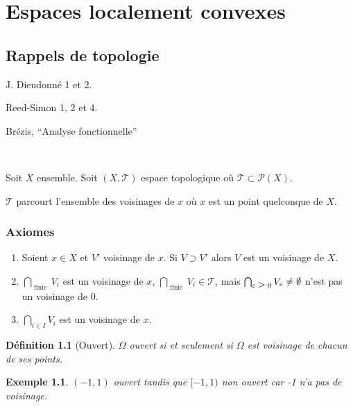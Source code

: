 \documentclass[french]{book}
\title{\bsc{Analyse fonctionnelle et distributions}}
\date{2023-2024}
\newtheorem{definition}{Définition}[section]
\newtheorem{exemple}{Exemple}
\newcommand{\biggg}{\rotatebox[origin=c]{90}{$\lor$}}
\newcommand{\bg}{\ \biggg\ }
\begin{document}
\maketitle

\tableofcontents

\chapter{Espaces localement convexes}

\section{Rappels de topologie}

J. Dieudonné 1 et 2.

Reed-Simon 1, 2 et 4.

Brézis, ``Analyse fonctionnelle''

\

Soit $X$ ensemble. Soit $(X, \mathscr{T} )$ espace topologique où $\mathscr{T}  \subset \mathscr{P}(X) $.

$\mathscr{T} $ parcourt l'ensemble des voisinages de $x$ où $x$ est un point quelconque de $X$.

\subsection{Axiomes}

\begin{enumerate}
  \item Soient $x \in X$ et $ V'$ voisinage de $x$. Si $V \supset V'$ alors $V$ est un voisinage de $X$.
  \item $\bigcap_{\text{ finie } }  V_i$ est un voisinage de $x$, $\bigcap_{\text{ finie } } V_i \in \mathscr{T}  $,  mais $\bigcap_{\varepsilon \bg 0} V _{\varepsilon }  \neq \emptyset$ n'est pas un voisinage de $0$.
  \item $\bigcap_{i \in I} V_i $ est un voisinage de $x$.
\end{enumerate}


\begin{definition}[Ouvert]
  $\Omega$ ouvert si et seulement si $\Omega$ est voisinage de chacun de ses points.
\end{definition}


\begin{exemple}
  $(-1, 1)$ ouvert tandis que $[-1, 1)$ non ouvert car -1 n'a pas de voisinage.
\end{exemple}
\end{document}
